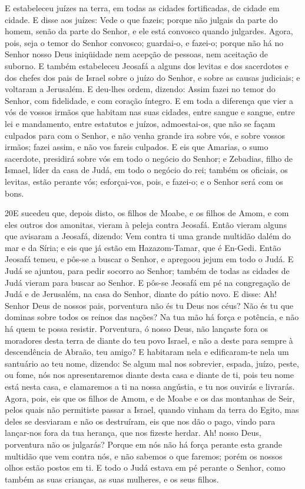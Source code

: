 E estabeleceu juízes na terra, em todas as cidades fortificadas,
de cidade em cidade. E disse aos juízes: Vede o que fazeis;
porque não julgais da parte do homem, senão da parte do Senhor, e
ele está convosco quando julgardes. Agora, pois, seja o temor do
Senhor convosco; guardai-o, e fazei-o; porque não há no Senhor nosso
Deus iniqüidade nem acepção de pessoas, nem aceitação de suborno.
E também estabeleceu Jeosafá a alguns dos levitas e dos
sacerdotes e dos chefes dos pais de Israel sobre o juízo do Senhor,
e sobre as causas judiciais; e voltaram a Jerusalém. E deu-lhes
ordem, dizendo: Assim fazei no temor do Senhor, com fidelidade, e
com coração íntegro. E em toda a diferença que vier a vós de
vossos irmãos que habitam nas suas cidades, entre sangue e sangue,
entre lei e mandamento, entre estatutos e juízos, admoestai-os, que
não se façam culpados para com o Senhor, e não venha grande ira
sobre vós, e sobre vossos irmãos; fazei assim, e não vos fareis
culpados. E eis que Amarias, o sumo sacerdote, presidirá
sobre vós em todo o negócio do Senhor; e Zebadias, filho de Ismael,
líder da casa de Judá, em todo o negócio do rei; também os oficiais,
os levitas, estão perante vós; esforçai-vos, pois, e fazei-o; e o
Senhor será com os bons.

\medskip

\lettrine{20} E sucedeu que, depois disto, os filhos de Moabe,
e os filhos de Amom, e com eles outros dos amonitas, vieram à peleja
contra Jeosafá. Então vieram alguns que avisaram a Jeosafá,
dizendo: Vem contra ti uma grande multidão dalém do mar e da Síria;
e eis que já estão em Hazazom-Tamar, que é En-Gedi. Então
Jeosafá temeu, e pôs-se a buscar o Senhor, e apregoou jejum em todo
o Judá. E Judá se ajuntou, para pedir socorro ao Senhor; também
de todas as cidades de Judá vieram para buscar ao Senhor. E
pôs-se Jeosafá em pé na congregação de Judá e de Jerusalém, na casa
do Senhor, diante do pátio novo. E disse: Ah! Senhor Deus de
nossos pais, porventura não és tu Deus nos céus? Não és tu que
dominas sobre todos os reinos das nações? Na tua mão há força e
potência, e não há quem te possa resistir. Porventura, ó nosso
Deus, não lançaste fora os moradores desta terra de diante do teu
povo Israel, e não a deste para sempre à descendência de Abraão, teu
amigo? E habitaram nela e edificaram-te nela um santuário ao teu
nome, dizendo: Se algum mal nos sobrevier, espada, juízo, peste,
ou fome, nós nos apresentaremos diante desta casa e diante de ti,
pois teu nome está nesta casa, e clamaremos a ti na nossa angústia,
e tu nos ouvirás e livrarás. Agora, pois, eis que os filhos
de Amom, e de Moabe e os das montanhas de Seir, pelos quais não
permitiste passar a Israel, quando vinham da terra do Egito, mas
deles se desviaram e não os destruíram, eis que nos dão o
pago, vindo para lançar-nos fora da tua herança, que nos fizeste
herdar. Ah! nosso Deus, porventura não os julgarás? Porque em
nós não há força perante esta grande multidão que vem contra nós, e
não sabemos o que faremos; porém os nossos olhos estão postos em ti.
E todo o Judá estava em pé perante o Senhor, como também as
suas crianças, as suas mulheres, e os seus filhos.

